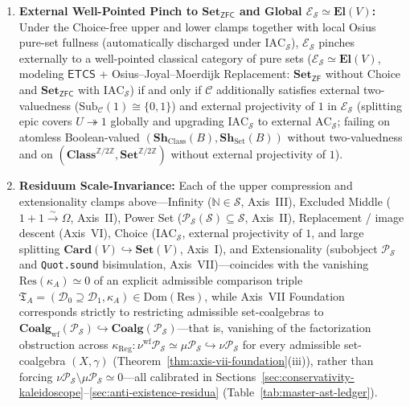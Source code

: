 \begin{theorem}
\begin{enumerate}
  \item \textbf{External Well-Pointed Pinch to $\mathbf{Set}_{\mathsf{ZFC}}$ and Global $\mathcal{E}_{\mathcal{S}} \simeq \mathbf{El}(V)$:} Under the Choice-free upper and lower clamps together with local Osius pure-set fullness (automatically discharged under $\mathrm{IAC}_{\mathcal{S}}$), $\mathcal{E}_{\mathcal{S}}$ pinches externally to a well-pointed classical category of pure sets ($\mathcal{E}_{\mathcal{S}} \simeq \mathbf{El}(V)$, modeling $\mathsf{ETCS}$ + Osius--Joyal--Moerdijk Replacement: $\mathbf{Set}_{\mathsf{ZF}}$ without Choice and $\mathbf{Set}_{\mathsf{ZFC}}$ with $\mathrm{IAC}_{\mathcal{S}}$) if and only if $\mathcal{C}$ additionally satisfies external two-valuedness ($\mathrm{Sub}_{\mathcal{C}}(1) \cong \{0, 1\}$) and external projectivity of $1$ in $\mathcal{E}_{\mathcal{S}}$ (splitting epic covers $U \twoheadrightarrow 1$ globally and upgrading $\mathrm{IAC}_{\mathcal{S}}$ to external $\mathrm{AC}_{\mathcal{S}}$; failing on atomless Boolean-valued $(\mathbf{Sh}_{\mathrm{Class}}(B), \mathbf{Sh}_{\mathrm{Set}}(B))$ without two-valuedness and on $(\mathbf{Class}^{\mathbb{Z}/2\mathbb{Z}}, \mathbf{Set}^{\mathbb{Z}/2\mathbb{Z}})$ without external projectivity of $1$).
  \item \textbf{Residuum Scale-Invariance:} Each of the upper compression and extensionality clamps above---Infinity ($\mathbb{N} \in \mathcal{S}$, Axis~III), Excluded Middle ($1 + 1 \xrightarrow{\sim} \Omega$, Axis~II), Power Set ($\mathcal{P}_{\mathcal{S}}(\mathcal{S}) \subseteq \mathcal{S}$, Axis~II), Replacement / image descent (Axis~VI), Choice ($\mathrm{IAC}_{\mathcal{S}}$, external projectivity of $1$, and large splitting $\mathbf{Card}(V) \hookrightarrow \mathbf{Set}(V)$, Axis~I), and Extensionality (subobject $\mathcal{P}_{\mathcal{S}}$ and \texttt{Quot.sound} bisimulation, Axis~VII)---coincides with the vanishing $\mathrm{Res}(\kappa_A) \simeq 0$ of an explicit admissible comparison triple $\mathfrak{T}_A = (\mathcal{D}_0 \supseteq \mathcal{D}_1, \kappa_A) \in \mathrm{Dom}(\mathrm{Res})$, while Axis~VII Foundation corresponds strictly to restricting admissible set-coalgebras to $\mathbf{Coalg}_{\mathrm{wf}}(\mathcal{P}_{\mathcal{S}}) \hookrightarrow \mathbf{Coalg}(\mathcal{P}_{\mathcal{S}})$---that is, vanishing of the factorization obstruction across $\kappa_{\mathrm{Reg}} : \nu^{\mathrm{wf}}\mathcal{P}_{\mathcal{S}} \simeq \mu\mathcal{P}_{\mathcal{S}} \hookrightarrow \nu\mathcal{P}_{\mathcal{S}}$ for every admissible set-coalgebra $(X, \gamma)$ (Theorem~\ref{thm:axis-vii-foundation}(iii)), rather than forcing $\nu\mathcal{P}_{\mathcal{S}} \setminus \mu\mathcal{P}_{\mathcal{S}} \simeq 0$---all calibrated in Sections~\ref{sec:conservativity-kaleidoscope}--\ref{sec:anti-existence-residua} (Table~\ref{tab:master-ast-ledger}).
\end{enumerate}
\end{theorem}

